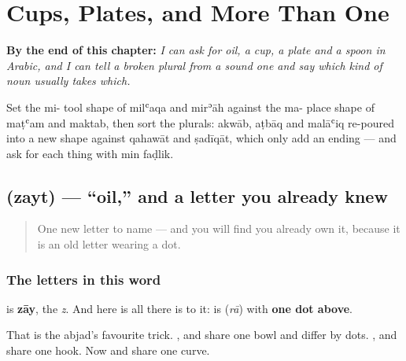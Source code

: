 
\chapter{Cups, Plates, and More Than One}
\label{ch:ar-cups-plates-and-more-than-one}

\begin{chapteropening}
\textbf{By the end of this chapter:} \emph{I can ask for oil, a cup, a plate and a spoon in Arabic, and I can tell a broken plural from a sound one and say which kind of noun usually takes which.}

Set the mi- tool shape of milʿaqa and mirʾāh against the ma- place shape of maṭʿam and maktab, then sort the plurals: akwāb, aṭbāq and malāʿiq re-poured into a new shape against qahawāt and ṣadīqāt, which only add an ending — and ask for each thing with min faḍlik.
\end{chapteropening}

\section[\texorpdfstring{\ar{زيت} (zayt)}{زيت (zayt)}]{ (zayt) — \textquotedblleft{}oil,\textquotedblright{} and a letter you already knew}

\label{lesson:AR-C36-zayt}



\begin{quote}
One new letter to name — and you will find you already own it, because it is an old letter wearing a dot.
\end{quote}

\subsection*{The letters in this word}
\textbf{} is \textbf{zāy}, the \emph{z}. And here is all there is to it: \textbf{} is \textbf{} (\emph{rā}) with \textbf{one dot above}.

That is the abjad's favourite trick. \textbf{}, \textbf{} and \textbf{} share one bowl and differ by dots. \textbf{}, \textbf{} and \textbf{} share one hook. Now \textbf{} and \textbf{} share one curve.

